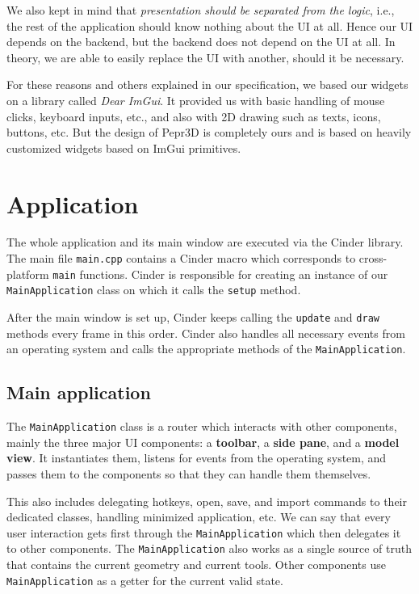 We also kept in mind that \emph{presentation should be separated from the logic}, i.e., the rest of the application should know nothing about the UI at all.
Hence our UI depends on the backend, but the backend does not depend on the UI at all.
In theory, we are able to easily replace the UI with another, should it be necessary.

For these reasons and others explained in our specification, we based our widgets on a library called \emph{Dear ImGui}.
It provided us with basic handling of mouse clicks, keyboard inputs, etc., and also with 2D drawing such as texts, icons, buttons, etc.
But the design of Pepr3D is completely ours and is based on heavily customized widgets based on ImGui primitives.

\section{Application}

\label{sec:app}

The whole application and its main window are executed via the Cinder library.
The main file \texttt{main.cpp} contains a Cinder macro which corresponds to cross-platform \texttt{main} functions.
Cinder is responsible for creating an instance of our \texttt{MainApplication} class on which it calls the \texttt{setup} method.

After the main window is set up, Cinder keeps calling the \texttt{update} and \texttt{draw} methods every frame in this order.
Cinder also handles all necessary events from an operating system and calls the appropriate methods of the \texttt{MainApplication}.

\subsection{Main application}

The \texttt{MainApplication} class is a router which interacts with other components, mainly the three major UI components: a \textbf{toolbar}, a \textbf{side pane}, and a \textbf{model view}.
It instantiates them, listens for events from the operating system, and passes them to the components so that they can handle them themselves.

This also includes delegating hotkeys, open, save, and import commands to their dedicated classes, handling minimized application, etc.
We can say that every user interaction gets first through the \texttt{MainApplication} which then delegates it to other components.
The \texttt{MainApplication} also works as a single source of truth that contains the current geometry and current tools.
Other components use \texttt{MainApplication} as a getter for the current valid state.

